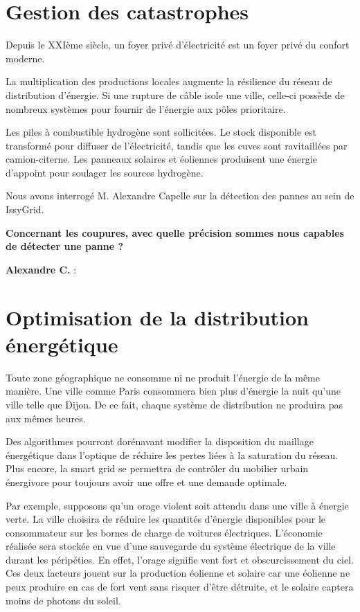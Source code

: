 
\section{Gestion des catastrophes}

Depuis le XXIème siècle, un foyer privé d'électricité est un foyer privé du confort moderne.

La multiplication des productions locales augmente la résilience du réseau de distribution d'énergie.
Si une rupture de câble isole une ville, celle-ci possède de nombreux systèmes pour fournir
de l'énergie aux pôles prioritaire.

Les piles à combustible hydrogène sont sollicitées. Le stock disponible est transformé pour diffuser de l'électricité,
tandis que les cuves sont ravitaillées par camion-citerne.
Les panneaux solaires et éoliennes produisent une énergie d'appoint pour soulager les sources hydrogène.

Nous avons interrogé M. Alexandre Capelle sur la détection des pannes au sein de IssyGrid.

\textbf{Concernant les coupures, avec quelle précision sommes nous capables de détecter une panne ?}

\textbf{Alexandre C.} :


\section{Optimisation de la distribution énergétique}

Toute zone géographique ne consomme ni ne produit l'énergie de la même manière.
Une ville comme Paris consommera bien plus d'énergie la nuit qu'une ville telle que Dijon.
De ce fait, chaque système de distribution ne produira pas aux mêmes heures.

Des algorithmes pourront dorénavant modifier la disposition du maillage énergétique dans l'optique
de réduire les pertes liées à la saturation du réseau. Plus encore, la smart grid se permettra de contrôler
du mobilier urbain énergivore pour toujours avoir une offre et une demande optimale.

Par exemple, supposons qu'un orage violent soit attendu dans une ville à énergie verte.
La ville choisira de réduire les quantités d'énergie disponibles pour le consommateur sur les bornes
de charge de voitures électriques.
L'économie réalisée sera stockée en vue d'une sauvegarde du système électrique de la ville durant les péripéties.
En effet, l'orage signifie vent fort et obscurcissement du ciel. Ces deux facteurs jouent sur la production
éolienne et solaire car une éolienne ne peux produire en cas de fort vent sans risquer d'être détruite, et le solaire
captera moins de photons du soleil.

